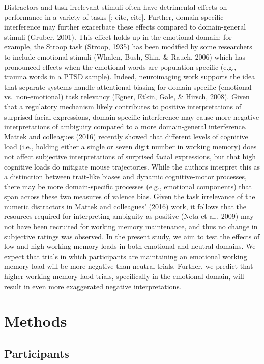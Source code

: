 \documentclass[man]{apa6}
\begin{document}
Distractors and task irrelevant stimuli often have detrimental effects on performance in a variety of tasks {[}; cite, cite{]}. Further, domain-specific interference may further exacerbate these effects compared to domain-general stimuli (Gruber, 2001). This effect holds up in the emotional domain; for example, the Stroop task (Stroop, 1935) has been modified by some researchers to include emotional stimuli (Whalen, Bush, Shin, \& Rauch, 2006) which has pronounced effects when the emotional words are population specific (e.g., trauma words in a PTSD sample). Indeed, neuroimaging work supports the idea that separate systems handle attentional biasing for domain-specific (emotional vs.~non-emotional) task relevancy (Egner, Etkin, Gale, \& Hirsch, 2008).
Given that a regulatory mechanism likely contributes to positive interpretations of surprised facial expressions, domain-specific interference may cause more negative interpretations of ambiguity compared to a more domain-general interference. Mattek and colleagues (2016) recently showed that different levels of cognitive load (i.e., holding either a single or seven digit number in working memory) does not affect subjective interpretations of surprised facial expressions, but that high cognitive loads do mitigate mouse trajectories. While the authors interpret this as a distinction between trait-like biases and dynamic cognitive-motor processes, there may be more domain-specific processes (e.g., emotional components) that span across these two measures of valence bias. Given the task irrelevance of the numeric distractors in Mattek and colleagues' (2016) work, it follows that the resources required for interpreting ambiguity as positive (Neta et al., 2009) may not have been recruited for working memory maintenance, and thus no change in subjective ratings was observed.
In the present study, we aim to test the effects of low and high working memory loads in both emotional and neutral domains. We expect that trials in which participants are maintaining an emotional working memory load will be more negative than neutral trials. Further, we predict that higher working memory laod trials, specifically in the emotional domain, will result in even more exaggerated negative interpretations.

\hypertarget{methods}{%
\section{Methods}\label{methods}}

\hypertarget{participants}{%
\subsection{Participants}\label{participants}}
\end{document}
